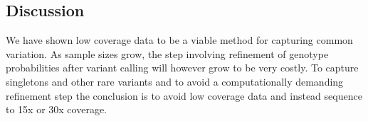 \subsection{Discussion}

We have shown low coverage data to be a viable method for capturing common variation. As sample sizes grow, the step involving refinement of genotype probabilities after variant calling will however grow to be very costly. To capture singletons and other rare variants and to avoid a computationally demanding refinement step the conclusion is to avoid low coverage data and instead sequence to 15x or 30x coverage.